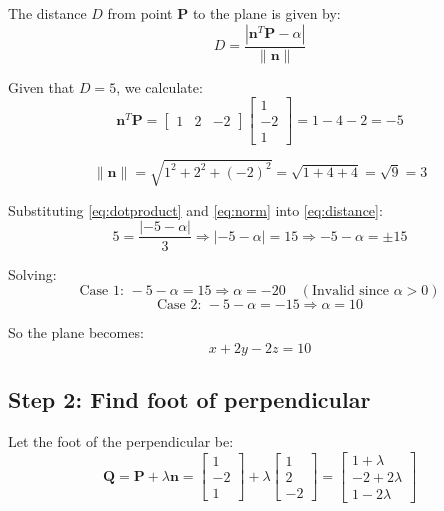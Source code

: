 \documentclass[journal]{IEEEtran}
\begin{document}
The distance \( D \) from point \( \mathbf{P} \) to the plane is given by:
\begin{equation}
D = \frac{|\mathbf{n}^T \mathbf{P} - \alpha|}{\|\mathbf{n}\|}
\label{eq:distance}
\end{equation}

Given that \( D = 5 \), we calculate:
\begin{equation}
\mathbf{n}^T \mathbf{P} = \begin{bmatrix} 1 & 2 & -2 \end{bmatrix} \begin{bmatrix} 1 \\ -2 \\ 1 \end{bmatrix} = 1 - 4 -2 = -5
\label{eq:dotproduct}
\end{equation}

\begin{equation}
\|\mathbf{n}\| = \sqrt{1^2 + 2^2 + (-2)^2} = \sqrt{1 + 4 + 4} = \sqrt{9} = 3
\label{eq:norm}
\end{equation}

Substituting \eqref{eq:dotproduct} and \eqref{eq:norm} into \eqref{eq:distance}:
\begin{equation}
5 = \frac{|-5 - \alpha|}{3} \Rightarrow |-5 - \alpha| = 15
\Rightarrow -5 - \alpha = \pm 15
\end{equation}

Solving:
\[
\text{Case 1: } -5 - \alpha = 15 \Rightarrow \alpha = -20 \quad (\text{Invalid since } \alpha > 0)
\]
\[
\text{Case 2: } -5 - \alpha = -15 \Rightarrow \alpha = 10
\]

So the plane becomes:
\begin{equation}
x + 2y - 2z = 10
\label{eq:plane}
\end{equation}

\subsection*{Step 2: Find foot of perpendicular}

Let the foot of the perpendicular be:
\begin{equation}
\mathbf{Q} = \mathbf{P} + \lambda \mathbf{n} = \begin{bmatrix} 1 \\ -2 \\ 1 \end{bmatrix} + \lambda \begin{bmatrix} 1 \\ 2 \\ -2 \end{bmatrix}
= \begin{bmatrix} 1 + \lambda \\ -2 + 2\lambda \\ 1 - 2\lambda \end{bmatrix}
\label{eq:foot}
\end{equation}
\end{document}
